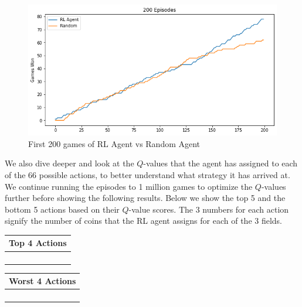 \documentclass[11pt, oneside]{article}   	%
\begin{document}
\begin{figure}[h]
    \centering
    \includegraphics[scale=0.5]{./images/rl_random200.png}
    \caption{First 200 games of RL Agent vs Random Agent}
    \label{fig:mesh1}
\end{figure}

We also dive deeper and look at the $Q$-values that the agent has assigned to each of the 66 possible actions, to better understand what strategy it has arrived at. We continue running the episodes to 1 million games to optimize the $Q$-values further before showing the following results. Below we show the top 5 and the bottom 5 actions based on their $Q$-value scores. The 3 numbers for each action signify the number of coins that the RL agent assigns for each of the 3 fields.

\hfill

\begin{center}
\begin{tabular}{ |c| } 
 \hline
 \textbf{Top 4 Actions} \\ 
 \hline
 [4, 0, 6] \\ 
 \hline
 [5, 0, 5] \\ 
 \hline
 [0, 4, 6] \\
 \hline
 [6, 1, 3] \\

 \hline
\end{tabular}
\quad
\begin{tabular}{ |c| } 
 \hline
\textbf{Worst 4 Actions} \\ 
 \hline
 [10, 0, 0]\\ 
 \hline
[0, 10, 0]\\
 \hline
[0, 8, 2]\\
 \hline
[0, 0, 10] \\
 \hline
\end{tabular}
\end{center}
\end{document}
